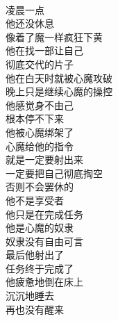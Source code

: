 \begin{poem}[完成任务的撸者]
    \begin{multicols}{2}
        \begin{center}~\\
            凌晨一点 \\ 他还没休息 \\ 像着了魔一样疯狂下黄 \\ 他在找一部让自己 \\ 彻底交代的片子 \\ 他在白天时就被心魔攻破 \\ 晚上只是继续心魔的操控 \\ 他感觉身不由己 \\ 根本停不下来 \\ 他被心魔绑架了 \\ 心魔给他的指令 \\ 就是一定要射出来 \\ 一定要把自己彻底掏空 \\ 否则不会罢休的 \\ 他不是享受者 \\ 他只是在完成任务 \\ 他是心魔的奴隶 \\ 奴隶没有自由可言 \\ 最后他射出了 \\ 任务终于完成了 \\ 他疲惫地倒在床上 \\ 沉沉地睡去 \\ 再也没有醒来
        \end{center}
    \end{multicols}
\end{poem}

